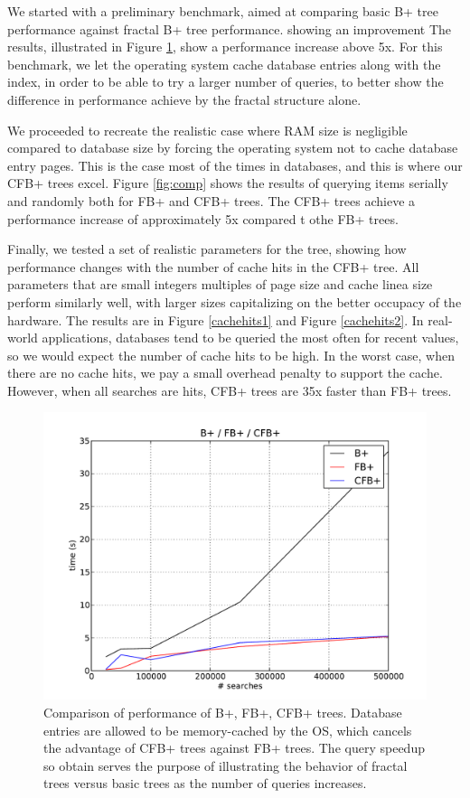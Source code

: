 \documentclass{article}
\begin{document}
We started with a preliminary benchmark, aimed at comparing basic B+ tree performance against fractal B+ tree performance. showing an improvement
The results, illustrated in Figure \ref{fig:base}, show a performance increase above 5x.
For this benchmark, we let the operating system cache database entries along with the index,
in order to be able to try a larger number of queries, to better show the difference in performance
achieve by the fractal structure alone.

We proceeded to recreate the realistic case where RAM size is negligible compared to database size by
forcing the operating system not to cache database entry pages.
This is the case most of the times in databases, and this is where our CFB+ trees excel.
Figure \ref{fig:comp} shows the results of querying items serially and randomly both for FB+ and CFB+ trees.
The CFB+ trees achieve a performance increase of approximately 5x compared t othe FB+ trees.

Finally, we tested a set of realistic parameters for the tree, showing how performance changes with the number
of cache hits in the CFB+ tree. All parameters that are small integers multiples of page size and cache linea
size perform similarly well, with larger sizes capitalizing on the better occupacy of the hardware.
The results are in Figure \ref{cachehits1} and Figure \ref{cachehits2}.
In real-world applications, databases tend to be queried the most often for recent values,
so we would expect the number of cache hits to be high.
In the worst case, when there are no cache hits, we pay a small overhead penalty to support the cache.
However, when all searches are hits, CFB+ trees are 35x faster than FB+ trees.
 
\begin{figure}[p]
\begin{center}
\includegraphics[width=350pt]{base}
\end{center}
\caption{
Comparison of performance of B+, FB+, CFB+ trees.
Database entries are allowed to be memory-cached by the OS, which cancels the advantage of CFB+ trees against FB+ trees.
The query speedup so obtain serves the purpose
of illustrating the behavior of fractal trees versus basic trees as the number of queries increases.
}
\label{fig:base}
\end{figure}
\end{document}
